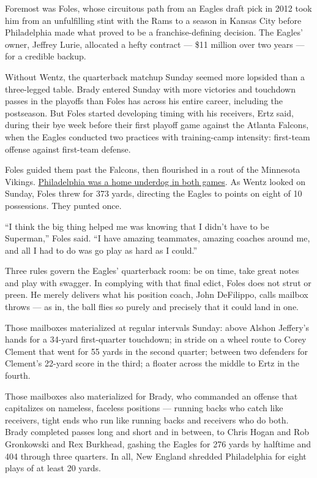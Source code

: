 Foremost was Foles, whose circuitous path from an Eagles draft pick in
2012 took him from an unfulfilling stint with the Rams to a season in
Kansas City before Philadelphia made what proved to be a
franchise-defining decision. The Eagles' owner, Jeffrey Lurie, allocated
a hefty contract --- \$11 million over two years --- for a credible
backup.

Without Wentz, the quarterback matchup Sunday seemed more lopsided than
a three-legged table. Brady entered Sunday with more victories and
touchdown passes in the playoffs than Foles has across his entire
career, including the postseason. But Foles started developing timing
with his receivers, Ertz said, during their bye week before their first
playoff game against the Atlanta Falcons, when the Eagles conducted two
practices with training-camp intensity: first-team offense against
first-team defense.

Foles guided them past the Falcons, then flourished in a rout of the
Minnesota Vikings.
\href{https://www.nytimes3xbfgragh.onion/2018/01/12/sports/nfl-playoffs-eagles-falcons.html}{Philadelphia
was a home underdog in both games}. As Wentz looked on Sunday, Foles
threw for 373 yards, directing the Eagles to points on eight of 10
possessions. They punted once.

``I think the big thing helped me was knowing that I didn't have to be
Superman,'' Foles said. ``I have amazing teammates, amazing coaches
around me, and all I had to do was go play as hard as I could.''

Three rules govern the Eagles' quarterback room: be on time, take great
notes and play with swagger. In complying with that final edict, Foles
does not strut or preen. He merely delivers what his position coach,
John DeFilippo, calls mailbox throws --- as in, the ball flies so purely
and precisely that it could land in one.

Those mailboxes materialized at regular intervals Sunday: above Alshon
Jeffery's hands for a 34-yard first-quarter touchdown; in stride on a
wheel route to Corey Clement that went for 55 yards in the second
quarter; between two defenders for Clement's 22-yard score in the third;
a floater across the middle to Ertz in the fourth.

Those mailboxes also materialized for Brady, who commanded an offense
that capitalizes on nameless, faceless positions --- running backs who
catch like receivers, tight ends who run like running backs and
receivers who do both. Brady completed passes long and short and in
between, to Chris Hogan and Rob Gronkowski and Rex Burkhead, gashing the
Eagles for 276 yards by halftime and 404 through three quarters. In all,
New England shredded Philadelphia for eight plays of at least 20 yards.

